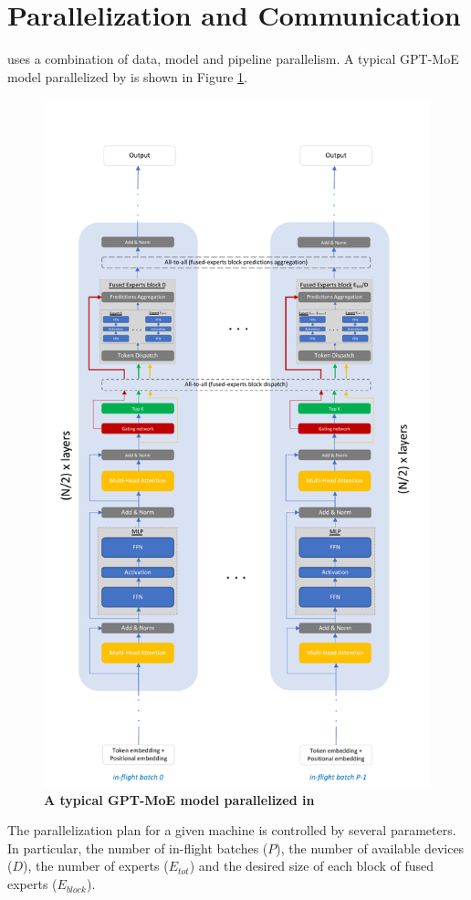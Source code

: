 \section{Parallelization and Communication}
\Project uses a combination of data, model and pipeline parallelism. A typical GPT-MoE model parallelized by \Project is shown in Figure \ref{fig:expertflow-gpt-moe}.
\begin{figure}[]
    \centering
    \includegraphics[width=0.9\linewidth]{figures/gpt-moe-illustration.pdf}
    \caption{\textbf{A typical GPT-MoE model parallelized in \Project}}
    \label{fig:expertflow-gpt-moe}
\end{figure}
The parallelization plan for a given machine is controlled by several parameters. In particular, the number of in-flight batches ($P$), the number of available devices ($D$), the number of experts ($E_{tot}$) and the desired size of each block of fused experts ($E_{block}$).


